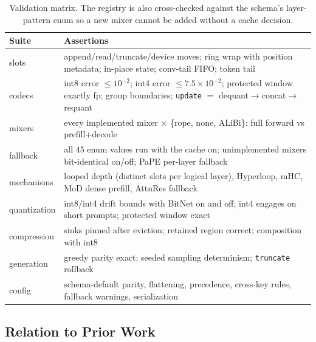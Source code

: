 \begin{table}[H]
\centering
\small
\begin{tabularx}{0.98\linewidth}{l X}
\toprule
\textbf{Suite} & \textbf{Assertions} \\
\midrule
slots & append/read/truncate/device moves; ring wrap with position metadata; in-place state; conv-tail FIFO; token tail \\
codecs & int8 error $\le 10^{-2}$; int4 error $\le 7.5\times10^{-2}$; protected window exactly fp; group boundaries; \texttt{update} $=$ dequant$\to$concat$\to$requant \\
mixers & every implemented mixer $\times$ \{rope, none, ALiBi\}: full forward vs prefill+decode \\
fallback & all $45$ enum values run with the cache on; unimplemented mixers bit-identical on/off; PaPE per-layer fallback \\
mechanisms & looped depth (distinct slots per logical layer), Hyperloop, mHC, MoD dense prefill, AttnRes fallback \\
quantization & int8/int4 drift bounds with BitNet on and off; int4 engages on short prompts; protected window exact \\
compression & sinks pinned after eviction; retained region correct; composition with int8 \\
generation & greedy parity exact; seeded sampling determinism; \texttt{truncate} rollback \\
config & schema-default parity, flattening, precedence, cross-key rules, fallback warnings, serialization \\
\bottomrule
\end{tabularx}
\caption{Validation matrix. The registry is also cross-checked against the schema's layer-pattern enum so a new mixer cannot be added without a cache decision.}
\label{tab:kv-tests}
\end{table}

\subsection{Relation to Prior Work}

